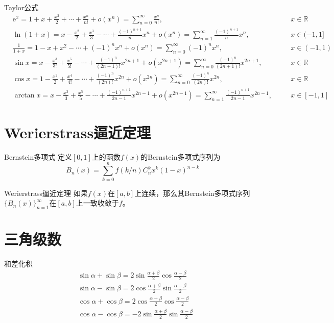 \documentclass[lang = cn, scheme = chinese, thmcnt = section]{elegantbook}
\begin{document}
\begin{theorem}{Taylor公式}
	\begin{align*}
		&\mathrm{e}^{x}
		=1+x+\frac{x^2}{2}+\cdots+\frac{x^n}{n!}+o(x^n)
		=\sum_{n=0}^{\infty}{\frac{x^n}{n!}}
		,\quad && x\in\mathbb{R}\\
		&\ln{(1+x)}
		=x-\frac{x^2}{2}+\frac{x^3}{3}-\cdots+\frac{(-1)^{n+1}}{n}x^n+o(x^n)
		=\sum_{n=1}^{\infty}{\frac{(-1)^{n+1}}{n}x^n}
		,\quad && x\in(-1,1]\\
		&\frac{1}{1+x}
		=1-x+x^2-\cdots+(-1)^n x^n+o(x^n)
		=\sum_{n=0}^{\infty}{(-1)^n x^n}
		,\quad && x\in(-1,1)\\
		&\sin{x}
		=x-\frac{x^3}{3!}+\frac{x^5}{5!}-\cdots+\frac{(-1)^n}{(2n+1)!}x^{2n+1}+o(x^{2n+1})
		=\sum_{n=0}^{\infty}{\frac{(-1)^n}{(2n+1)!}x^{2n+1}}
		,\quad && x\in\mathbb{R}\\
		&\cos{x}
		=1-\frac{x^2}{2}+\frac{x^4}{4!}-\cdots+\frac{(-1)^n}{(2n)!}x^{2n}+o(x^{2n})
		=\sum_{n=0}^{\infty}{\frac{(-1)^n}{(2n)!}x^{2n}}
		,\quad && x\in\mathbb{R}\\
		&\arctan{x}
		=x-\frac{x^3}{3}+\frac{x^5}{5}-\cdots+\frac{(-1)^{n+1}}{2n-1}x^{2n-1}+o(x^{2n-1})
		=\sum_{n=1}^{\infty}{\frac{(-1)^{n+1}}{2n-1}x^{2n-1}}
		,\quad && x\in[-1,1]
	\end{align*}
\end{theorem}

\section{Werierstrass逼近定理}

\begin{definition}{Bernstein多项式}
	定义$[0,1]$上的函数$f(x)$的Bernstein多项式序列为
	$$
	B_n(x)=\sum_{k=0}^{n}f(k/n)C_n^k x^k(1-x)^{n-k}
	$$
\end{definition}

\begin{theorem}{Werierstrass逼近定理}
	如果$f(x)$在$[a,b]$上连续，那么其Bernstein多项式序列$\{B_n(x)\}_{n=1}^{\infty}$在$[a,b]$上一致收敛于$f$。
\end{theorem}

\section{三角级数}

\begin{theorem}{和差化积}
	\begin{align*}
		&\sin\alpha+\sin\beta=2\sin\frac{\alpha+\beta}{2}\cos\frac{\alpha-\beta}{2}\\
		&\sin\alpha-\sin\beta=2\cos\frac{\alpha+\beta}{2}\sin\frac{\alpha-\beta}{2}\\
		&\cos\alpha+\cos\beta=2\cos\frac{\alpha+\beta}{2}\cos\frac{\alpha-\beta}{2}\\
		&\cos\alpha-\cos\beta=-2\sin\frac{\alpha+\beta}{2}\sin\frac{\alpha-\beta}{2}
	\end{align*}
\end{theorem}
\end{document}
